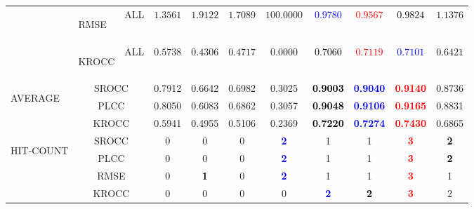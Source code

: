 \documentclass{article}
\begin{document}
\begin{table}
\begin{tabular}{||l|l|l||cccccccc||}
\cmidrule{2-11}\cmidrule{2-11}
&\multirow{1}{*}{\begin{turn}{-90}RMSE\end{turn}}&ALL&$1.3561$&$1.9122$&$1.7089$&$100.0000$&\textbf{\textcolor{blue}{$0.9780$}}&\textbf{\textcolor{red}{$0.9567$}}&\textbf{\textcolor{black}{$0.9824$}}&$1.1376$\\
\cmidrule{2-11}\cmidrule{2-11}
&\multirow{1}{*}{\begin{turn}{-90}KROCC\end{turn}}&ALL&$0.5738$&$0.4306$&$0.4717$&$0.0000$&\textbf{\textcolor{black}{$0.7060$}}&\textbf{\textcolor{red}{$0.7119$}}&\textbf{\textcolor{blue}{$0.7101$}}&$0.6421$\\
\midrule\midrule
\multirow{3}{*}{\begin{turn}{-90}AVERAGE\end{turn}}&\multicolumn{2}{c||}{SROCC}&0.7912&0.6642&0.6982&0.3025&\textbf{\textcolor{black}{0.9003}}&\textbf{\textcolor{blue}{0.9040}}&\textbf{\textcolor{red}{0.9140}}&0.8736
\\ \cmidrule{2-11}
&\multicolumn{2}{c||}{PLCC}&0.8050&0.6083&0.6862&0.3057&\textbf{\textcolor{black}{0.9048}}&\textbf{\textcolor{blue}{0.9106}}&\textbf{\textcolor{red}{0.9165}}&0.8831
\\ \cmidrule{2-11}
&\multicolumn{2}{c||}{KROCC}&0.5941&0.4955&0.5106&0.2369&\textbf{\textcolor{black}{0.7220}}&\textbf{\textcolor{blue}{0.7274}}&\textbf{\textcolor{red}{0.7430}}&0.6865
\\ \midrule \midrule
\multirow{4}{*}{\begin{turn}{-90}HIT-COUNT\end{turn}}&\multicolumn{2}{c||}{SROCC}&0&0&0&\textbf{\textcolor{blue}{2}}&1&1&\textbf{\textcolor{red}{3}}&\textbf{\textcolor{black}{2}}
\\ \cmidrule{2-11}
&\multicolumn{2}{c||}{PLCC}&0&0&0&\textbf{\textcolor{blue}{2}}&1&1&\textbf{\textcolor{red}{3}}&\textbf{\textcolor{black}{2}}
\\ \cmidrule{2-11}
&\multicolumn{2}{c||}{RMSE}&0&\textbf{\textcolor{black}{1}}&0&\textbf{\textcolor{blue}{2}}&1&1&\textbf{\textcolor{red}{3}}&1
\\ \cmidrule{2-11}
&\multicolumn{2}{c||}{KROCC}&0&0&0&0&\textbf{\textcolor{blue}{2}}&\textbf{\textcolor{black}{2}}&\textbf{\textcolor{red}{3}}&2
\\ \midrule \midrule
\end{tabular}
\end{table}
\end{document}

